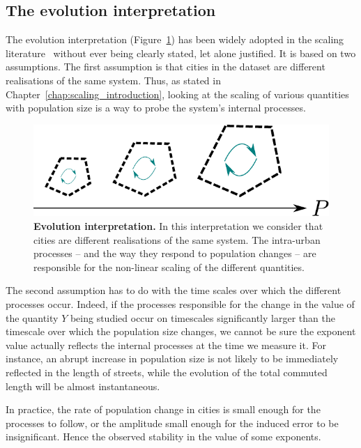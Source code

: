 \subsection{The evolution interpretation}
\label{sub:the_evolution_interpretation}

The evolution interpretation (Figure~\ref{fig:evolution_interpretation}) has
been widely adopted in the scaling literature~\cite{Bettencourt:2007,
Bettencourt:2013,Louf:2014_scaling} without ever being clearly stated, let alone
justified. It is based on two assumptions. The first assumption is that cities in the dataset
are different realisations of the same system. Thus, as stated in
Chapter~\ref{chap:scaling_introduction}, looking at the scaling of various
quantities with population size is a way to probe the system's internal
processes.

\begin{figure}[!h]
    \centering
    \includegraphics[width=\textwidth]{gfx/chapter-scaling/evolution-interpretation.pdf}
    \caption{{\bf Evolution interpretation.} In this interpretation we consider
    that cities are different realisations of the same system. The intra-urban
processes -- and the way they respond to population changes -- are responsible for the non-linear scaling of the different
quantities.\label{fig:evolution_interpretation}}
\end{figure}

The second assumption has to do with the time scales over which the different
processes occur. Indeed, if the processes responsible for the change in the
value of the quantity $Y$ being studied occur on timescales significantly larger
than the timescale over which the population size changes, we cannot be sure the
exponent value actually reflects the internal processes at the time we measure
it.  For instance, an abrupt increase in population size is not likely to be
immediately reflected in the length of streets, while the evolution of the total
commuted length will be almost instantaneous. 

In practice, the rate of population change in cities is small enough for the
processes to follow, or the amplitude small enough for the induced error to be
insignificant. Hence the observed stability in the value of some exponents.\\


